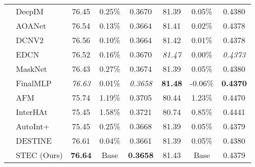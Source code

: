 \documentclass{article}
\begin{document}
\begin{table}[t]
{\begin{tabular}{llcccccc}
                              & DeepIM                 & 76.45 & 0.25\%  & 0.3670    & 81.39  & 0.05\%  & 0.4380     \\
                              & AOANet                 & 76.54 & 0.13\%  & 0.3664    & 81.41  & 0.02\% & 0.4378     \\
                              & DCNV2                  & 76.56 & 0.10\%  & 0.3664    & 81.42  & 0.01\%  & 0.4378     \\
                              & EDCN                   & 76.52 & 0.16\%  & 0.3670    & \textit{81.47}  & 0.00\% & \textit{0.4373}     \\
                              & MaskNet                & 76.43 & 0.27\%  & 0.3674    & 81.39  & 0.05\%  & 0.4380     \\
                              & FinalMLP               & \textit{76.63} & 0.01\%  & \textit{0.3658}    & \textbf{81.48}  & -0.06\% & \textbf{0.4370}     \\ \hline
{}   & AFM                    & 75.74 & 1.19\%  & 0.3705    & 80.44  & 1.23\%  & 0.4470     \\ 
                              & InterHAt               & 75.45 & 1.58\%  & 0.3721    & 80.74  & 0.85\%  & 0.4441     \\
                              & AutoInt+               & 75.45 & 0.25\%  & 0.3668    & 81.39  & 0.05\%  & 0.4379     \\
                              & DESTINE                & 76.61 & 0.04\%  & 0.3661    & 81.39  & 0.05\%  & 0.4380     \\
                              & STEC (Ours)            & \textbf{76.64} & Base    & \textbf{0.3658}    & 81.43  & Base    & 0.4379     \\ \hline

\end{tabular}}
\end{table}
\end{document}
